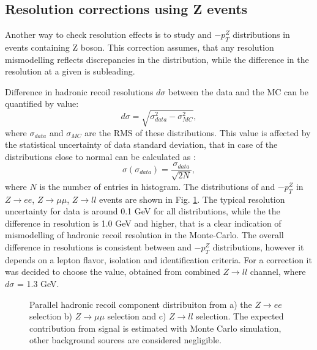 \subsection{Resolution corrections using Z events}\label{sec:ZperpSmear}

Another way to check resolution effects is to study \uperp and \upar  $ - p_T^{Z}$ distributions in events containing Z boson. This correction assumes, that any resolution mismodelling reflects discrepancies in the \sumet distribution, while the difference in the resolution at a given \sumet is subleading. 

Difference in hadronic recoil resolutions $d\sigma$ between the data and the MC can be quantified by value:
\begin{equation}
d\sigma=\sqrt{\sigma_{data}^2-\sigma_{MC}^2},
\end{equation}
where $\sigma_{data}$ and $\sigma_{MC}$ are the RMS of these distributions. This value is affected by the statistical uncertainty of data standard deviation, that in case of the distributions close to normal can be calculated as \cite{AdvStat}:
\begin{equation}
\sigma( \sigma_{data} ) = \frac{\sigma_{data}}{\sqrt{2N} },
\end{equation}
where $N$ is the number of entries in histogram. The distributions of \uperp and \upar  $ - p_T^{Z}$ in $Z\to ee$, $Z\to \mu\mu$, $Z\to ll$ events are shown in Fig. \ref{HadrRecoil:UparSmear}. The typical resolution uncertainty for data is around 0.1 GeV for all distributions, while the the difference in resolution is 1.0 GeV and higher, that is a clear indication of mismodelling of hadronic recoil resolution in the Monte-Carlo. The overall difference in resolutions is consistent between \uperp and \upar  $ - p_T^{Z}$ distributions, however it depends on a lepton flavor, isolation and identification criteria. For a correction it was decided to choose the value, obtained from combined $Z\to ll$ channel, where $d\sigma$ = 1.3 GeV.

\begin{figure}[!tbp]
\begin{minipage}[h]{0.32\linewidth}
\end{minipage}
\hfill
\begin{minipage}[h]{0.32\linewidth}
\end{minipage}
\hfill
\begin{minipage}[h]{0.32\linewidth}
\end{minipage}
\caption{Parallel hadronic recoil component distribuiton from a) the $Z\to ee$ selection b) $Z\to\mu\mu$ selection and c) $Z\to ll$ selection. The expected contribution from signal is estimated with Monte Carlo simulation, other background sources are considered negligible.}
\label{HadrRecoil:UparSmear}
\end{figure}

